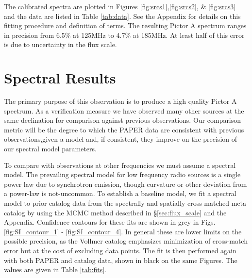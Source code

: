 \documentclass[preprint]{aastex}
\begin{document}
The calibrated spectra are plotted in Figures \ref{fig:srcs1},\ref{fig:srcs2},
\& \ref{fig:srcs3} and the data are listed in Table \ref{tab:data}.  See the
Appendix for details on this fitting procedure and definition of terms.  The
resulting Pictor A spectrum ranges in precision from 6.5\% at 125MHz to 4.7\%
at 185MHz. At least half of this error is due to uncertainty in the flux scale.  


 \section{Spectral Results}
 \label{sec:fits}

The primary purpose of this observation is to produce a high quality Pictor A
spectrum. As a verification measure we have observed many other sources at the
same declination for comparison against previous observations.  Our comparison
metric will be the degree to which the PAPER data are consistent with previous
observations,given a model and, if consistent, they improve on the precision of
our spectral model parameters.

To compare with observations at other frequencies we must assume a spectral
model. The prevailing spectral model for low frequency radio sources is a
single power law due to synchrotron emission, though curvature or other
deviation from a power-law is not-uncommon.   To establish a baseline model, we
fit a spectral model to prior catalog data from the spectrally and spatially
cross-matched meta-catalog by \citet{Vollmer:2010p6422} using the MCMC method
described in \S \ref{sec:flux_scale} and the Appendix. Confidence contours for
these fits are shown in grey in Figs. \ref{fig:SI_contour_1} -
\ref{fig:SI_contour_4}.  In general these are lower limits on the possible
precision, as the Vollmer catalog emphasizes minimization of cross-match error
but at the cost of excluding data points.  The fit is then performed again with
both PAPER and catalog data, shown in black on the same Figures. The values are
given in Table \ref{tab:fits}. 
\end{document}
